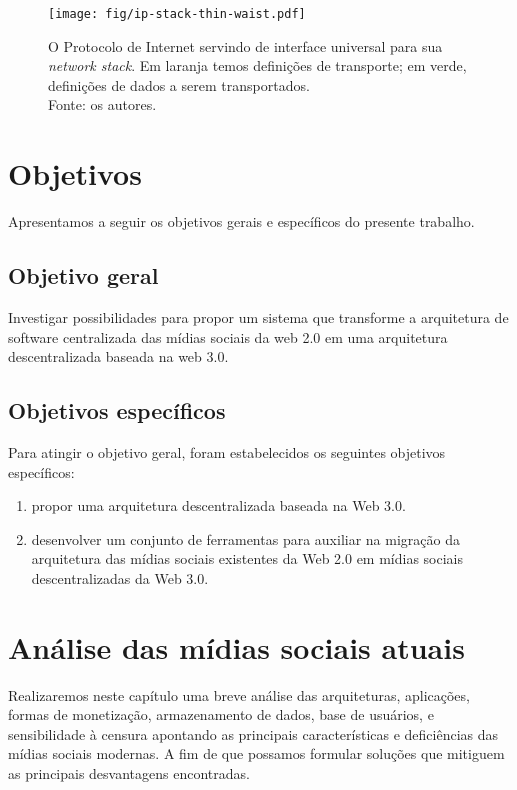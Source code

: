 \begin{figure}[htb!]
    \centering
    \texttt{[image: fig/ip-stack-thin-waist.pdf]}
    \caption[Protolo de Internet: ampulheta]{\label{fig:ip-stack-thin-waist}
        O Protocolo de Internet servindo de interface universal para sua \textit{network stack}.
        Em laranja temos definições de transporte; em verde, definições de dados a serem transportados.\\
        Fonte: os autores.
    }
\end{figure}

\chapter{Objetivos}

Apresentamos a seguir os objetivos gerais e específicos do presente trabalho.

\section{Objetivo geral}

Investigar possibilidades para propor um sistema que transforme a arquitetura de software centralizada das mídias sociais da web 2.0 em uma arquitetura descentralizada baseada na web 3.0.

\section{Objetivos específicos}

Para atingir o objetivo geral, foram estabelecidos os seguintes objetivos específicos:

\begin{enumerate}
    \item propor uma arquitetura descentralizada baseada na Web 3.0.
    \item desenvolver um conjunto de ferramentas para auxiliar na migração da arquitetura das mídias sociais existentes da Web 2.0 em mídias sociais descentralizadas da Web 3.0.
\end{enumerate}

\chapter{Análise das mídias sociais atuais}

Realizaremos neste capítulo uma breve análise das arquiteturas, aplicações, formas de monetização, armazenamento de dados, base de usuários, e sensibilidade à censura apontando as principais características e deficiências das mídias sociais modernas.
A fim de que possamos formular soluções que mitiguem as principais desvantagens encontradas.

